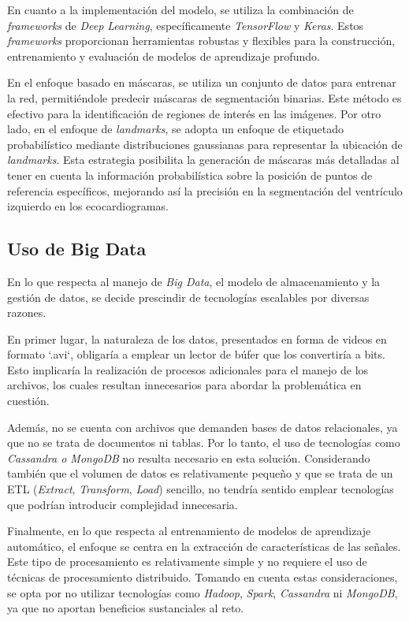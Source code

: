 \documentclass[runningheads]{llncs}
\begin{document}
En cuanto a la implementación del modelo, se utiliza la combinación de \textit{frameworks} de \textit{Deep Learning}, específicamente \textit{TensorFlow} y \textit{Keras}. Estos \textit{frameworks} proporcionan herramientas robustas y flexibles para la construcción, entrenamiento y evaluación de modelos de aprendizaje profundo.

En el enfoque basado en máscaras, se utiliza un conjunto de datos para entrenar la red, permitiéndole predecir máscaras de segmentación binarias. Este método es efectivo para la identificación de regiones de interés en las imágenes. Por otro lado, en el enfoque de \textit{landmarks}, se adopta un enfoque de etiquetado probabilístico mediante distribuciones gaussianas para representar la ubicación de \textit{landmarks}. Esta estrategia posibilita la generación de máscaras más detalladas al tener en cuenta la información probabilística sobre la posición de puntos de referencia específicos, mejorando así la precisión en la segmentación del ventrículo izquierdo en los ecocardiogramas.

\subsection{Uso de Big Data}
En lo que respecta al manejo de \textit{Big Data}, el modelo de almacenamiento y la gestión de datos, se decide prescindir de tecnologías escalables por diversas razones.

En primer lugar, la naturaleza de los datos, presentados en forma de videos en formato `.avi`, obligaría a emplear un lector de búfer que los convertiría a bits. Esto implicaría la realización de procesos adicionales para el manejo de los archivos, los cuales resultan innecesarios para abordar la problemática en cuestión.

Además, no se cuenta con archivos que demanden bases de datos relacionales, ya que no se trata de documentos ni tablas. Por lo tanto, el uso de tecnologías como \textit{Cassandra o MongoDB} no resulta necesario en esta solución. Considerando también que el volumen de datos es relativamente pequeño y que se trata de un ETL (\textit{Extract}, \textit{Transform}, \textit{Load}) sencillo, no tendría sentido emplear tecnologías que podrían introducir complejidad innecesaria.

Finalmente, en lo que respecta al entrenamiento de modelos de aprendizaje automático, el enfoque se centra en la extracción de características de las señales. Este tipo de procesamiento es relativamente simple y no requiere el uso de técnicas de procesamiento distribuido. Tomando en cuenta estas consideraciones, se opta por no utilizar tecnologías como \textit{Hadoop}, \textit{Spark}, \textit{Cassandra} ni \textit{MongoDB}, ya que no aportan beneficios sustanciales al reto. 
\end{document}
